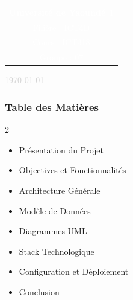 \documentclass[11pt, aspectratio=169]{beamer}
\begin{document}
\begin{frame}[plain]
\begin{center}
        {\normalsize \textcolor{white}{
            \begin{tabular}{c}
                \textbf{Université de Yaoundé 1} \\
                Filière : ICT4D \\
                Cours : ICT318 \\
                Groupe : 07
            \end{tabular}
        }}
        
        \vspace{2cm}
        
        {\small \textcolor{LightGray}{\today}}
    \end{center}
\end{frame}


\begin{frame}[plain]
    \frametitle{Table des Matières}
    
    \begin{multicols}{2}
        \begin{itemize}
            \item[\textcolor{DarkBlue}{\large \textbf{I.}}] Présentation du Projet
            \item[\textcolor{DarkBlue}{\large \textbf{II.}}] Objectives et Fonctionnalités
            \item[\textcolor{DarkBlue}{\large \textbf{III.}}] Architecture Générale
            \item[\textcolor{DarkBlue}{\large \textbf{IV.}}] Modèle de Données
            \item[\textcolor{DarkBlue}{\large \textbf{V.}}] Diagrammes UML
            \item[\textcolor{DarkBlue}{\large \textbf{VI.}}] Stack Technologique
            \item[\textcolor{DarkBlue}{\large \textbf{VII.}}] Configuration et Déploiement
            \item[\textcolor{DarkBlue}{\large \textbf{VIII.}}] Conclusion
        \end{itemize}
    \end{multicols}
\end{frame}

\end{document}
